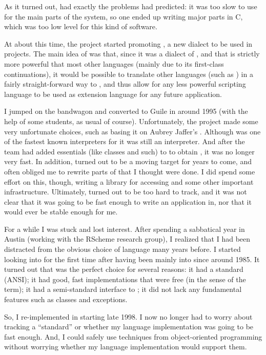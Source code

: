 As it turned out, {\elk} had exactly the problems {\rms} had
predicted: it was too slow to use for the main parts of the system, so
one ended up writing major parts in C, which was too low level for
this kind of software. 

At about this time, the {\gnu} project started promoting {\guile}, 
a new {\scheme} dialect to be used in {\gnu} projects.  The main idea
of {\guile} was that, since it was a dialect of {\scheme}, and that
{\scheme} is strictly more powerful that most other languages (mainly
due to its first-class continuations), it would be possible to
translate other languages (such as {\tcl}) in a fairly
straight-forward way to {\guile}, and thus allow for any less powerful
scripting language to be used as extension language for any future
{\gnu} application. 

I jumped on the {\guile} bandwagon and converted {\gs} to Guile in
around 1995 (with the help of some students, as usual of course).
Unfortunately, the {\guile} project made some very unfortunate
choices, such as basing it on Aubrey Jaffer's {\scm}.  Although {\scm}
was one of the fastest known interpreters for {\scheme} it was still
an interpreter.  And after the {\guile} team had added essentials
(like classes and such) to {\scm} to obtain {\guile}, it was no longer
very fast.  In addition, {\guile} turned out to be a moving target for
years to come, and often obliged me to rewrite parts of {\gs} that I
thought were done.  I did spend some effort on this, though, writing a
library for accessing {\xwin} and some other important
infrastructure.  Ultimately, {\guile} turned out to be too hard to
track, and it was not clear that it was going to be fast enough to
write an application in, nor that it would ever be stable enough for
me. 

For a while I was stuck and lost interest.  After spending a
sabbatical year in Austin (working with the RScheme research group), I
realized that I had been distracted from the obvious choice of
language many years before.  I started looking into {\commonlisp} for the
first time after having been mainly into {\scheme} since around 1985.
It turned out that {\commonlisp} was the perfect choice for several reasons:
it had a standard (ANSI); it had good, fast implementations that were
free (in the {\gnu} sense of the term); it had a semi-standard
interface to {\xwin}; it did not lack any fundamental features such as
classes and exceptions. 

So, I re-implemented {\gs} in {\commonlisp} starting late 1998.  I now no
longer had to worry about tracking a ``standard'' or whether my
language implementation was going to be fast enough.  And, I could
safely use techniques from object-oriented programming without
worrying whether my language implementation would support them. 

